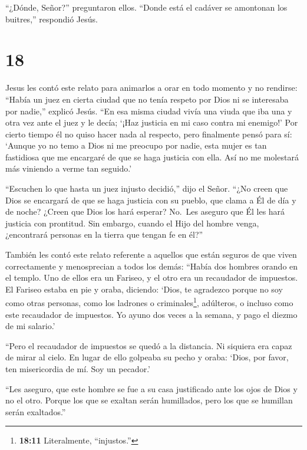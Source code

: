  ``¿Dónde, Señor?'' preguntaron ellos. ``Donde está el
cadáver se amontonan los buitres,'' respondió Jesús.

\hypertarget{section-17}{%
\section{18}\label{section-17}}

 Jesus les contó este relato para animarlos a orar en todo
momento y no rendirse:  ``Había un juez en cierta ciudad que
no tenía respeto por Dios ni se interesaba por nadie,'' explicó Jesús.
 ``En esa misma ciudad vivía una viuda que iba una y otra
vez ante el juez y le decía; `¡Haz justicia en mi caso contra mi
enemigo!'  Por cierto tiempo él no quiso hacer nada al
respecto, pero finalmente pensó para sí: `Aunque yo no temo a Dios ni me
preocupo por nadie,  esta mujer es tan fastidiosa que me
encargaré de que se haga justicia con ella. Así no me molestará más
viniendo a verme tan seguido.'

 ``Escuchen lo que hasta un juez injusto decidió,'' dijo el
Señor.  ``¿No creen que Dios se encargará de que se haga
justicia con su pueblo, que clama a Él de día y de noche? ¿Creen que
Dios los hará esperar?  No.~Les aseguro que Él les hará
justicia con prontitud. Sin embargo, cuando el Hijo del hombre venga,
¿encontrará personas en la tierra que tengan fe en él?''

 También les contó este relato referente a aquellos que
están seguros de que viven correctamente y menosprecian a todos los
demás:  ``Había dos hombres orando en el templo. Uno de
ellos era un Fariseo, y el otro era un recaudador de impuestos.
 El Fariseo estaba en pie y oraba, diciendo: `Dios, te
agradezco porque no soy como otras personas, como los ladrones o
criminales\footnote{\textbf{18:11} Literalmente, ``injustos.''},
adúlteros, o incluso como este recaudador de impuestos.  Yo
ayuno dos veces a la semana, y pago el diezmo de mi salario.'

 ``Pero el recaudador de impuestos se quedó a la distancia.
Ni siquiera era capaz de mirar al cielo. En lugar de ello golpeaba su
pecho y oraba: `Dios, por favor, ten misericordia de mí. Soy un
pecador.'

 ``Les aseguro, que este hombre se fue a su casa
justificado ante los ojos de Dios y no el otro. Porque los que se
exaltan serán humillados, pero los que se humillan serán exaltados.''

